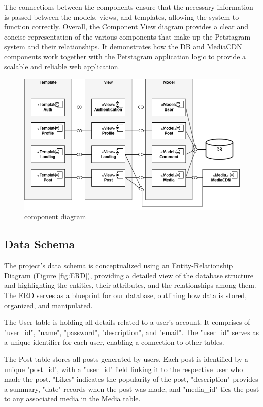 \documentclass[lettersize,journal]{IEEEtran}
\begin{document}
The connections between the components ensure that the necessary information is passed between the models, views, and templates, allowing the system to function correctly. Overall, the Component View diagram provides a clear and concise representation of the various components that make up the Petstagram system and their relationships. It demonstrates how the DB and MediaCDN components work together with the Petstagram application logic to provide a scalable and reliable web application.

\begin{figure}[!t]
    \centering
    \includegraphics[width=3.5 in]{diagrams/ComponentView.png}
    \caption{component diagram}
    \label{fig:ComponentView}
\end{figure}

\subsection{Data Schema}

\noindent The project's data schema is conceptualized using an Entity-Relationship Diagram (Figure \ref{fig:ERD}), providing a detailed view of the database structure and highlighting the entities, their attributes, and the relationships among them. The ERD serves as a blueprint for our database, outlining how data is stored, organized, and manipulated.

The User table is holding all details related to a user's account. It comprises of "user\_id", "name", "password", "description", and "email". The "user\_id" serves as a unique identifier for each user, enabling a connection to other tables. 

The Post table stores all posts generated by users. Each post is identified by a unique "post\_id", with a "user\_id" field linking it to the respective user who made the post. "Likes" indicates the popularity of the post, "description" provides a summary, "date" records when the post was made, and "media\_id" ties the post to any associated media in the Media table. 
\end{document}
